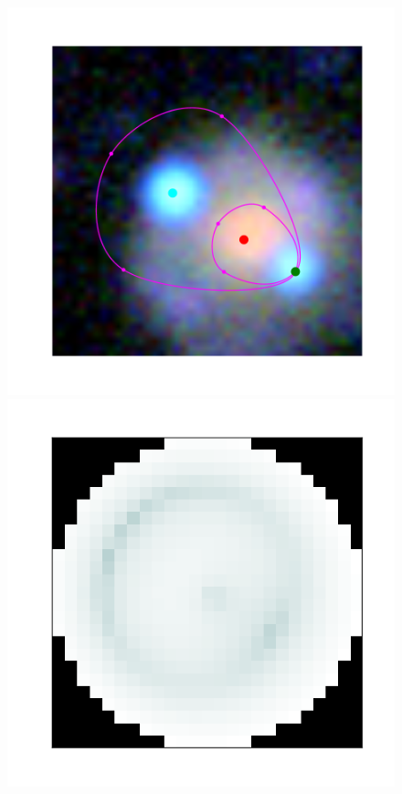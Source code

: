 \begin{figure}
  \centering
  \includegraphics[width=\myplotswidth]{fig/006941_input}
  \includegraphics[width=\myplotswidth]{fig/006941_arr_time} \\

\end{figure}
